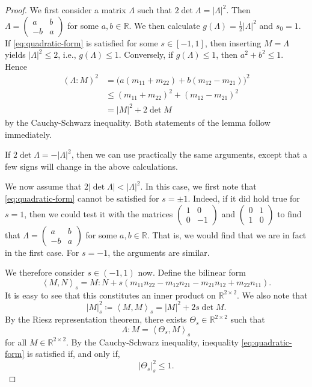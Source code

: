 \documentclass[a4paper]{article}
\newcommand{\R}{\mathbb{R}}
\newcommand{\scp}[2]{\left\langle #1, #2 \right\rangle}
\theoremstyle{definition}
\theoremstyle{remark}
\begin{document}
\begin{proof}
We first consider a matrix $\Lambda$ such that $2\det \Lambda = |\Lambda|^2$.
Then $\Lambda = (\begin{smallmatrix} a & b \\ -b & a \end{smallmatrix})$
for some $a, b \in \R$. We then calculate $g(\Lambda) = \frac{1}{2} |\Lambda|^2$
and $s_0 = 1$.
If \eqref{eq:quadratic-form} is satisfied for some $s \in [-1, 1]$,
then inserting $M = \Lambda$ yields
$|\Lambda|^2 \le 2$, i.e., $g(\Lambda) \le 1$. Conversely, if $g(\Lambda) \le 1$,
then $a^2 + b^2 \le 1$. Hence
\[
\begin{split}
(\Lambda : M)^2 & = \bigl(a(m_{11} + m_{22}) + b(m_{12} - m_{21})\bigr)^2 \\
& \le (m_{11} + m_{22})^2 + (m_{12} - m_{21})^2 \\
& = |M|^2 + 2\det M
\end{split}
\]
by the Cauchy-Schwarz inequality. Both statements of the lemma follow immediately.

If $2\det \Lambda = -|\Lambda|^2$, then we can use practically the same arguments, except that a few signs will change in the above calculations.

We now assume that $2|\det \Lambda| < |\Lambda|^2$.
In this case, we first note that \eqref{eq:quadratic-form} cannot be
satisfied for $s = \pm 1$. Indeed, if it did hold true for $s = 1$, then we
could test it with the matrices $(\begin{smallmatrix} 1 & 0 \\ 0 & -1 \end{smallmatrix})$ and $(\begin{smallmatrix} 0 & 1 \\ 1 & 0 \end{smallmatrix})$
to find that $\Lambda = (\begin{smallmatrix} a & b \\ -b & a \end{smallmatrix})$
for some $a, b \in \R$. That is, we would find that we are in fact in the first
case. For $s = -1$, the arguments are similar.

We therefore consider $s \in (-1, 1)$ now. Define the bilinear form
\[
\scp{M}{N}_s = M : N + s(m_{11} n_{22} - m_{12} n_{21} - m_{21} n_{12} + m_{22} n_{11}).
\]
It is easy to see that this constitutes an inner product on $\R^{2 \times 2}$.
We also note that
\[
|M|_s^2 \coloneqq \scp{M}{M}_s = |M|^2 + 2s \det M.
\]
By the Riesz representation theorem, there exists
$\Theta_s \in \R^{2 \times 2}$ such that
\[
\Lambda : M = \scp{\Theta_s}{M}_s
\]
for all $M \in \R^{2 \times 2}$. By the Cauchy-Schwarz inequality,
inequality \eqref{eq:quadratic-form} is satisfied if, and only if,
\[
|\Theta_s|_s^2 \le 1.
\]


\end{proof}
\end{document}
